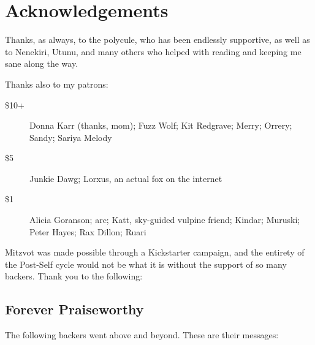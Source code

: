 \chapter*{Acknowledgements}

Thanks, as always, to the polycule, who has been endlessly supportive, as well as to Nenekiri, Utunu, and many others who helped with reading and keeping me sane along the way.

Thanks also to my patrons:

\begin{description}
    \item[\$10+]
    Donna Karr (thanks, mom); Fuzz Wolf; Kit Redgrave; Merry; Orrery; Sandy; Sariya Melody

    \item[\$5]
    Junkie Dawg; Lorxus, an actual fox on the internet

    \item[\$1]
    Alicia Goranson; arc; Katt, sky-guided vulpine friend; Kindar; Muruski; Peter Hayes; Rax Dillon; Ruari
\end{description}

Mitzvot was made possible through a Kickstarter campaign, and the entirety of the Post-Self cycle would not be what it is without the support of so many backers. Thank you to the following:

\section*{Forever Praiseworthy}

The following backers went above and beyond. These are their messages:

